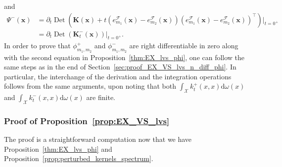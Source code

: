 \documentclass[twoside,11pt]{book}
\DeclareMathOperator{\Det}{Det}
\DeclareMathOperator{\Tran}{\intercal}
\DeclareMathOperator{\X}{\mathcal{X}}
\newcommand{\ab}[1]{\textcolor{red}{#1}}
\begin{document}
and
\begin{align}
\Psi^{-}(\bm{x}) & = \partial_{t} \Det \left(\bm{K}(\bm{x})+t \left(e_{m_{1}}^{\mathcal{F}}(\bm{x}) - e_{m_{2}}^{\mathcal{F}}(\bm{x}) \right)\left(e_{m_{1}}^{\mathcal{F}}(\bm{x}) - e_{m_{2}}^{\mathcal{F}}(\bm{x}) \right)^{\Tran} \right)|_{t = 0^{+}} \nonumber \\
& = \partial_{t} \Det \left(\bm{K}_{t}^{-}(\bm{x})\right)|_{t = 0^{+}}.
\end{align}
In order to prove that $\phi_{m_{1},m_{2}}^{+}$ and $\phi_{m_{1},m_{2}}^{-}$ are right differentiable in zero along with the second equation in Proposition~\ref{thm:EX_lvs_phi}, one can follow the same steps as in the end of Section~\ref{sec:proof_EX_VS_lvs_n_diff_phi}. In particular, the interchange of the derivation and the integration operations follows from the same arguments, upon noting that both $\int_{\X} k_{t}^{+}(x,x) \mathrm{d}\omega(x)$ and $\int_{\X} k_{t}^{-}(x,x) \mathrm{d}\omega(x)$ are finite.



\subsubsection{Proof of Proposition~\ref{prop:EX_VS_lvs}}\label{sec:proof_EX_VS_lvs}
The proof is a straightforward computation now that we have Proposition~\ref{thm:EX_lvs_phi} and Proposition~\ref{prop:perturbed_kernels_spectrum}.
\end{document}
